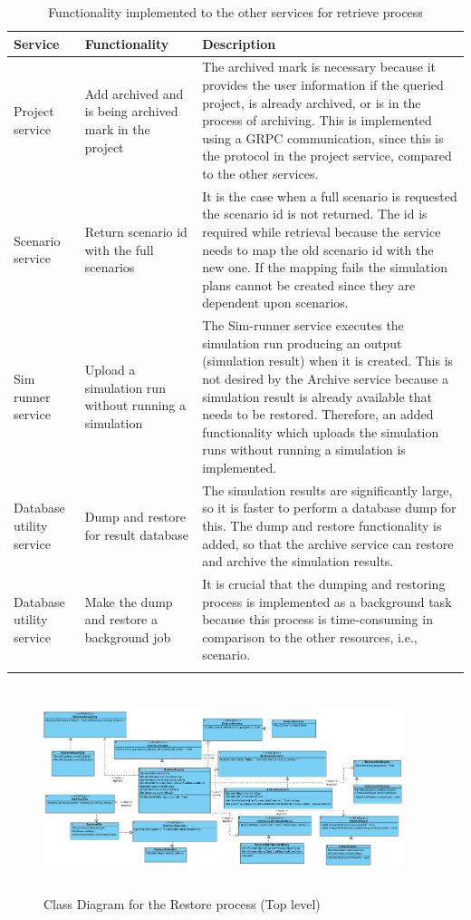     \begin{longtable}{|p{2cm}|p{6cm}|p{6cm}|}
        \hline
            \textbf{Service}  & \textbf{Functionality} & \textbf{Description}\\
        \hline
            Project service & Add archived and is being archived mark in the project &  The archived mark is necessary because
            it provides the user information if the queried project, is already archived, or is in the process of archiving. This is
            implemented using a GRPC communication, since this is the protocol in the project service, compared to the other services.  \\
        \hline
            Scenario service & Return scenario id with the full scenarios & It is the case when a full scenario is requested the scenario id is
            not returned. The id is required while retrieval because the service needs to map the old scenario id with the new one. If the mapping
            fails the simulation plans cannot be created since they are dependent upon scenarios.\\
        \hline
            Sim runner service & Upload a simulation run without running a simulation & The Sim-runner service executes the simulation run producing an
            output (simulation result) when it is created. This is not desired by the Archive service because a simulation result is already available that needs to be restored.
            Therefore, an added 
            functionality which uploads the simulation runs without running a simulation is implemented.\\
        \hline
            Database utility service & Dump and restore for result database & The simulation results are significantly large, so it is faster to
            perform a database dump for this. The dump and restore functionality is added, so that the archive service can restore and archive the simulation results.\\
        \hline
            Database utility service & Make the dump and restore a background job & It is crucial that the dumping and restoring process is implemented as a background task
            because this process is time-consuming in comparison to the other resources, i.e., scenario.\\

        \hline
        \caption{Functionality implemented to the other services for retrieve process}
        \label{table:funcRestore} 
    \end{longtable}

\begin{figure}[H]
    \centering \includegraphics[height=6cm, angle=90, origin=c, width=10.5cm]{grafiken/restoreClass.png}
    \caption{Class Diagram for the Restore process (Top level)}
    \label{fig:restoreClass}
\end{figure}
